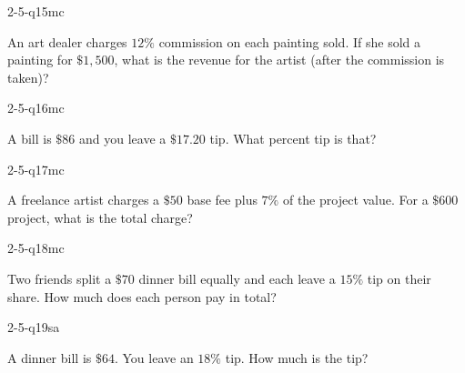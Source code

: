 \begin{practiceQuestion}{2-5-q15}{mc}
\begin{questionText}
An art dealer charges $12\%$ commission on each painting sold. If she sold a painting for $\$1{,}500$, what is the revenue for the artist (after the commission is taken)?
\end{questionText}
\end{practiceQuestion}

\begin{practiceQuestion}{2-5-q16}{mc}
\begin{questionText}
A bill is $\$86$ and you leave a $\$17.20$ tip. What percent tip is that?
\end{questionText}
\end{practiceQuestion}

\begin{practiceQuestion}{2-5-q17}{mc}
\begin{questionText}
A freelance artist charges a $\$50$ base fee plus $7\%$ of the project value. For a $\$600$ project, what is the total charge?
\end{questionText}
\end{practiceQuestion}

\begin{practiceQuestion}{2-5-q18}{mc}
\begin{questionText}
Two friends split a $\$70$ dinner bill equally and each leave a $15\%$ tip on their share. How much does each person pay in total?
\end{questionText}
\end{practiceQuestion}


\begin{practiceQuestion}{2-5-q19}{sa}
\begin{questionText}
A dinner bill is $\$64$. You leave an $18\%$ tip. How much is the tip?
\end{questionText}
\end{practiceQuestion}

